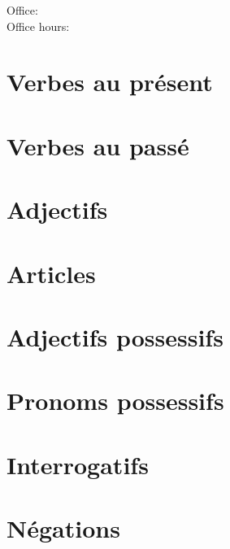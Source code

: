 \documentclass{beamer}
\subtitle[Révision]{La révision pour le dernier examen}
\begin{document}
  \begin{frame}
    \titlepage
    \tiny{Office: \\
          Office hours: }
  \end{frame}


  \begin{frame}
    \hypertarget{début}{}
    \tableofcontents[hideallsubsections]
  \end{frame}

  \section{Verbes au présent}
  \section{Verbes au passé}
  \section{Adjectifs}
  \section{Articles}
  \section{Adjectifs possessifs}
  \section{Pronoms possessifs}
  \section{Interrogatifs}
  \section{Négations}
\end{document}
